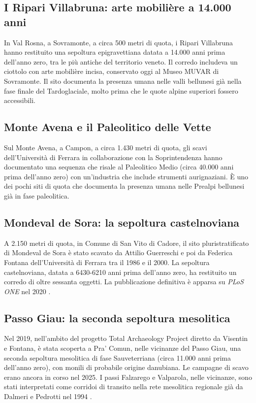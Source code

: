 \subsection{I Ripari Villabruna: arte mobilière a 14.000 anni}

In Val Rosna, a Sovramonte, a circa 500 metri di quota, i Ripari Villabruna hanno restituito una sepoltura epigravettiana datata a 14.000 anni prima dell'anno zero, tra le più antiche del territorio veneto. Il corredo includeva un ciottolo con arte mobilière incisa, conservato oggi al Museo MUVAR di Sovramonte. Il sito documenta la presenza umana nelle valli bellunesi già nella fase finale del Tardoglaciale, molto prima che le quote alpine superiori fossero accessibili.

\subsection{Monte Avena e il Paleolitico delle Vette}

Sul Monte Avena, a Campon, a circa 1.430 metri di quota, gli scavi dell'Università di Ferrara in collaborazione con la Soprintendenza hanno documentato una sequenza che risale al Paleolitico Medio (circa 40.000 anni prima dell'anno zero) con un'industria che include strumenti aurignaziani. È uno dei pochi siti di quota che documenta la presenza umana nelle Prealpi bellunesi già in fase paleolitica.

\subsection{Mondeval de Sora: la sepoltura castelnoviana}

A 2.150 metri di quota, in Comune di San Vito di Cadore, il sito pluristratificato di Mondeval de Sora è stato scavato da Attilio Guerreschi e poi da Federica Fontana dell'Università di Ferrara tra il 1986 e il 2000. La sepoltura castelnoviana, datata a 6430-6210 anni prima dell'anno zero, ha restituito un corredo di oltre sessanta oggetti. La pubblicazione definitiva è apparsa su \emph{PLoS ONE} nel 2020 \citep{fontana2020}.

\subsection{Passo Giau: la seconda sepoltura mesolitica}

Nel 2019, nell'ambito del progetto Total Archaeology Project diretto da Visentin e Fontana, è stata scoperta a Pra' Comun, nelle vicinanze del Passo Giau, una seconda sepoltura mesolitica di fase Sauveterriana (circa 11.000 anni prima dell'anno zero), con monili di probabile origine danubiana. Le campagne di scavo erano ancora in corso nel 2025. I passi Falzarego e Valparola, nelle vicinanze, sono stati interpretati come corridoi di transito nella rete mesolitica regionale già da Dalmeri e Pedrotti nel 1994 \citep{dalmeri1994}.

